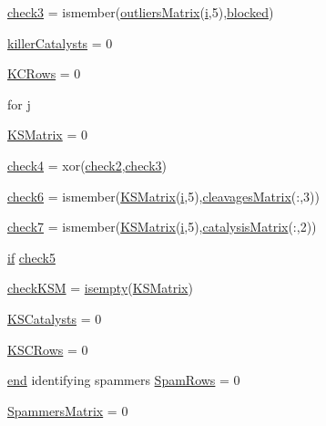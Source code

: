 \begin{DoxyCompactItemize}
\item 
\hyperlink{a00029_adfd17509248a56986475a25ee50fe488}{check3} = ismember(\hyperlink{a00030_a9733b61dd859b1133aa3aa849cf70cbc}{outliers\-Matrix}(\hyperlink{a00113_ad3efca1ea6e3333daf30719ee0501862}{i},5),\hyperlink{a00030_a1faaaae288fc8ca4ed1751049aa2f84f}{blocked})
\item 
\hyperlink{a00029_a1a42aaee01b2cc37a3835e0fe30cf9d3}{killer\-Catalysts} = 0
\item 
\hyperlink{a00029_a62227634d3ceda9bf932c630583da2b9}{K\-C\-Rows} = 0
\item 
for \hyperlink{a00029_ad34e9c7e9ae69ae0b9f1866faed5e4ad}{j}
\item 
\hyperlink{a00029_aea43faf8d3d68de03c645edc96b0c1c0}{K\-S\-Matrix} = 0
\item 
\hyperlink{a00029_ab21c5bac10f7ac73374c002e908df5ac}{check4} = xor(\hyperlink{a00030_a98a8838a85ed24032563a44271b1525a}{check2},\hyperlink{a00030_adfd17509248a56986475a25ee50fe488}{check3})
\item 
\hyperlink{a00029_a0c9b097ea561ab0f23a69197786a243a}{check6} = ismember(\hyperlink{a00030_ab18f9eabd5f873bd17d226d786bc22df}{K\-S\-Matrix}(\hyperlink{a00113_ad3efca1ea6e3333daf30719ee0501862}{i},5),\hyperlink{a00030_a90d1d83fdcae4fb1cba5129d5820d33c}{cleavages\-Matrix}(\-:,3))
\item 
\hyperlink{a00029_a0bbe7d2ceb7b248f0826d069d5a1b735}{check7} = ismember(\hyperlink{a00030_ab18f9eabd5f873bd17d226d786bc22df}{K\-S\-Matrix}(\hyperlink{a00113_ad3efca1ea6e3333daf30719ee0501862}{i},5),\hyperlink{a00030_a244eec8903103b5bbddef461276286ce}{catalysis\-Matrix}(\-:,2))
\item 
\hyperlink{a00030_a01d55766b8058903dd360b4bda71f9f5}{if} \hyperlink{a00029_abee07c73829351d18ba356c86e3e096d}{check5}
\item 
\hyperlink{a00029_a67eb148eecfd241148ce3711f058ac2b}{check\-K\-S\-M} = \hyperlink{a00025_ac10445404f4b83302522defb59e25ef7}{isempty}(\hyperlink{a00030_ab18f9eabd5f873bd17d226d786bc22df}{K\-S\-Matrix})
\item 
\hyperlink{a00029_a25c085d4378366ed81f0f97547802c8f}{K\-S\-Catalysts} = 0
\item 
\hyperlink{a00029_a56aa0b3ac00410dc36f9043c641ae205}{K\-S\-C\-Rows} = 0
\item 
\hyperlink{a00025_afb358f48b1646c750fb9da6c6585be2b}{end} identifying spammers \hyperlink{a00029_a834631ce660b52d721b1dd57b60d5251}{Spam\-Rows} = 0
\item 
\hyperlink{a00029_af1801174c9397e7fad0394203f120c31}{Spammers\-Matrix} = 0

\end{DoxyCompactItemize}
